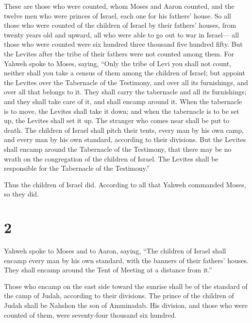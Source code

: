 These are those who were counted, whom Moses and Aaron
counted, and the twelve men who were princes of Israel, each one for his
fathers' house.  So all those who were counted of the
children of Israel by their fathers' houses, from twenty years old and
upward, all who were able to go out to war in Israel--- 
all those who were counted were six hundred three thousand five hundred
fifty.  But the Levites after the tribe of their fathers
were not counted among them.  For Yahweh spoke to Moses,
saying,  ``Only the tribe of Levi you shall not count,
neither shall you take a census of them among the children of Israel;
 but appoint the Levites over the Tabernacle of the
Testimony, and over all its furnishings, and over all that belongs to
it. They shall carry the tabernacle and all its furnishings; and they
shall take care of it, and shall encamp around it.  When
the tabernacle is to move, the Levites shall take it down; and when the
tabernacle is to be set up, the Levites shall set it up. The stranger
who comes near shall be put to death.  The children of
Israel shall pitch their tents, every man by his own camp, and every man
by his own standard, according to their divisions.  But
the Levites shall encamp around the Tabernacle of the Testimony, that
there may be no wrath on the congregation of the children of Israel. The
Levites shall be responsible for the Tabernacle of the Testimony.''

 Thus the children of Israel did. According to all that
Yahweh commanded Moses, so they did.

\hypertarget{section-1}{%
\section{2}\label{section-1}}

 Yahweh spoke to Moses and to Aaron, saying,
 ``The children of Israel shall encamp every man by his
own standard, with the banners of their fathers' houses. They shall
encamp around the Tent of Meeting at a distance from it.''

 Those who encamp on the east side toward the sunrise
shall be of the standard of the camp of Judah, according to their
divisions. The prince of the children of Judah shall be Nahshon the son
of Amminadab.  His division, and those who were counted of
them, were seventy-four thousand six hundred.

